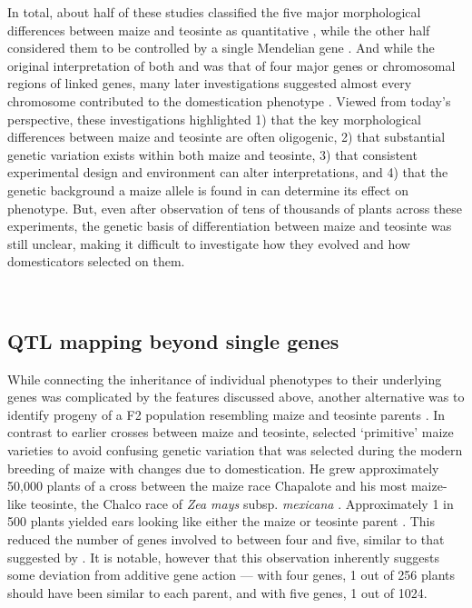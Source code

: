 \documentclass[9pt,twocolumn,twoside]{rilabRxiv}
\begin{document}
﻿In total, about half of these studies classified the five major morphological differences between maize and teosinte as quantitative  \citep{collins1920, mangelsdorf1947, rogers1950a, rogers1950b}, while the other half considered them to be controlled by a single Mendelian gene \citep{langham1940, galinat1971, galinat1988}.
﻿And while the original interpretation of both \citet{mangelsdorf1939} and \citet{beadle1939} was that of four major genes or chromosomal regions of linked genes, many later investigations suggested almost every chromosome contributed to the domestication phenotype \citep{mangelsdorf1947, rogers1950a, rogers1950b}.
Viewed from today's perspective, these investigations highlighted 1) that the key morphological differences between maize and teosinte are often oligogenic, 2) that substantial genetic variation exists within both maize and teosinte, 3) that consistent experimental design and environment can alter interpretations, and 4) that the genetic background a maize allele is found in can determine its effect on phenotype.
But, even after observation of tens of thousands of plants across these experiments, the genetic basis of differentiation between maize and teosinte was still unclear, making it difficult to investigate how they evolved and how domesticators selected on them.

﻿\subsection*{QTL mapping beyond single genes}

﻿While connecting the inheritance of individual phenotypes to their underlying genes was complicated by the features discussed above, another alternative was to identify progeny of a F2 population resembling maize and teosinte parents \citep{beadle1972}.
In  contrast to earlier crosses between maize and teosinte, \citet{beadle1972} selected `primitive' maize varieties to avoid confusing genetic variation that was selected during the modern breeding of maize with changes due to domestication.
He grew approximately 50,000 plants of a cross between the maize race Chapalote and his most maize-like teosinte, the Chalco race of \textit{Zea mays} subsp. \textit{mexicana} \citep{beadle1972, beadle1980}.
Approximately 1 in 500 plants yielded ears looking like either the maize or teosinte parent \citep{beadle1972, beadle1980}.
This reduced the number of genes involved to between four and five, similar to that suggested by \citet{langham1940}.
It is notable, however that this observation inherently suggests some deviation from additive gene action --- with four genes, 1 out of 256 plants should have been similar to each parent, and with five genes, 1 out of 1024.
\end{document}
